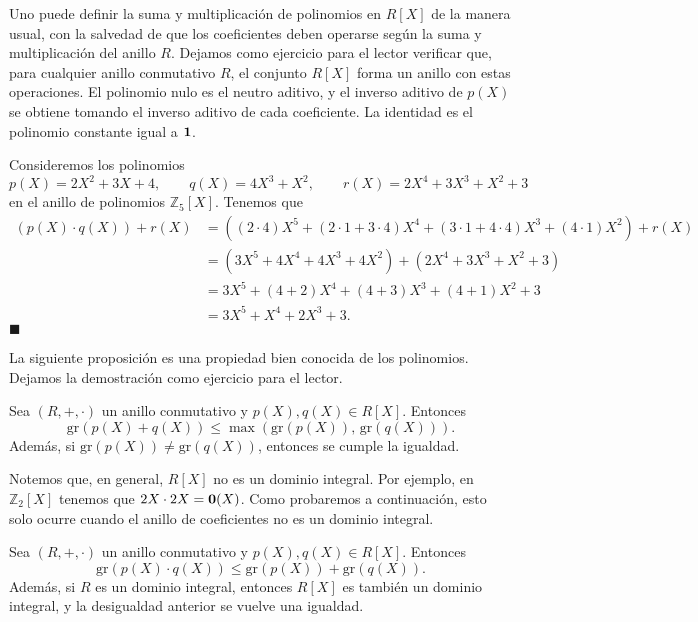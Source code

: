Uno puede definir la suma y multiplicación de polinomios en $R[X]$ de la manera usual, con la salvedad de que los coeficientes deben operarse según la suma y multiplicación del anillo $R$. Dejamos como ejercicio para el lector verificar que, para cualquier anillo conmutativo $R$, el conjunto $R[X]$ forma un anillo con estas operaciones. El polinomio nulo es el neutro aditivo, y el inverso aditivo de $p(X)$ se obtiene tomando el inverso aditivo de cada coeficiente. La identidad es el polinomio constante igual a $\mathbf{1}$.

\begin{example}
Consideremos los polinomios 
$$p(X) = 2X^2 + 3X + 4, \qquad q(X) = 4X^3 + X^2, \qquad r(X) = 2X^4 + 3X^3 + X^2 + 3$$
en el anillo de polinomios $\mathbb{Z}_5[X]$. Tenemos que
\begin{align*}
(p(X) \cdot q(X)) + r(X) &= \left((2 \cdot 4)X^5 + (2 \cdot 1 + 3 \cdot 4)X^4 + (3 \cdot 1 + 4 \cdot 4)X^3 + (4 \cdot 1)X^2 \right) + r(X) \\
&= (3X^5 + 4X^4 + 4X^3 + 4X^2) + (2X^4 + 3X^3 + X^2 + 3) \\
&= 3X^5 + (4 + 2)X^4 + (4 + 3)X^3 + (4 + 1)X^2 + 3 \\
&= 3X^5 + X^4 + 2X^3 + 3.
\end{align*}
\hfill$\blacksquare$
\end{example}

La siguiente proposición es una propiedad bien conocida de los polinomios. Dejamos la demostración como ejercicio para el lector.

\begin{proposition} \label{grado_suma}
Sea $(R, +, \cdot)$ un anillo conmutativo y $p(X), q(X) \in R[X]$. Entonces
$$\mathrm{gr}(p(X) + q(X)) \leq \max\left( \mathrm{gr}(p(X)),\, \mathrm{gr}(q(X))\right).$$
Además, si $\mathrm{gr}(p(X)) \neq \mathrm{gr}(q(X))$, entonces se cumple la igualdad.
\end{proposition}


Notemos que, en general, $R[X]$ no es un dominio integral. Por ejemplo, en $\mathbb{Z}_2[X]$ tenemos que $2X \cdot 2X = \mathbf{0}(X)$. Como probaremos a continuación, esto solo ocurre cuando el anillo de coeficientes no es un dominio integral.

\begin{proposition} \label{grado_producto}
Sea $(R, +, \cdot)$ un anillo conmutativo y $p(X), q(X) \in R[X]$. Entonces
$$\mathrm{gr}(p(X) \cdot q(X)) \leq \mathrm{gr}(p(X)) + \mathrm{gr}(q(X)).$$
Además, si $R$ es un dominio integral, entonces $R[X]$ es también un dominio integral, y la desigualdad anterior se vuelve una igualdad.
\end{proposition}

